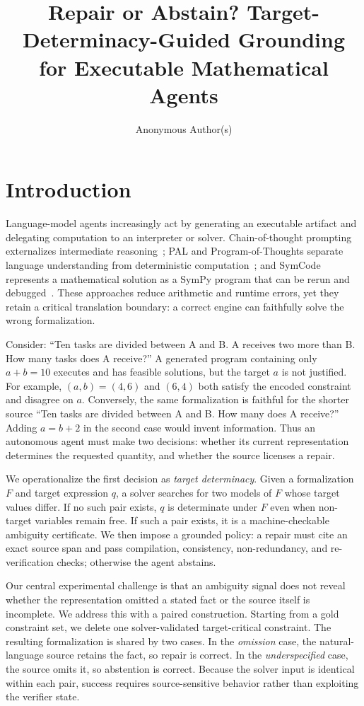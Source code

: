 \documentclass[sigconf,anonymous]{aamas}
\title{Repair or Abstain? Target-Determinacy-Guided Grounding for Executable Mathematical Agents}
\author{Anonymous Author(s)}
\begin{document}
\maketitle

\section{Introduction}
Language-model agents increasingly act by generating an executable artifact and delegating computation to an interpreter or solver.  Chain-of-thought prompting externalizes intermediate reasoning~\cite{wei2022cot}; PAL and Program-of-Thoughts separate language understanding from deterministic computation~\cite{gao2023pal,chen2023pot}; and SymCode represents a mathematical solution as a SymPy program that can be rerun and debugged~\cite{nezhad2026symcode}.  These approaches reduce arithmetic and runtime errors, yet they retain a critical translation boundary: a correct engine can faithfully solve the wrong formalization.

Consider: ``Ten tasks are divided between A and B. A receives two more than B. How many tasks does A receive?''  A generated program containing only $a+b=10$ executes and has feasible solutions, but the target $a$ is not justified.  For example, $(a,b)=(4,6)$ and $(6,4)$ both satisfy the encoded constraint and disagree on $a$.  Conversely, the same formalization is faithful for the shorter source ``Ten tasks are divided between A and B. How many does A receive?''  Adding $a=b+2$ in the second case would invent information.  Thus an autonomous agent must make two decisions: whether its current representation determines the requested quantity, and whether the source licenses a repair.

We operationalize the first decision as \emph{target determinacy}.  Given a formalization $F$ and target expression $q$, a solver searches for two models of $F$ whose target values differ.  If no such pair exists, $q$ is determinate under $F$ even when non-target variables remain free.  If such a pair exists, it is a machine-checkable ambiguity certificate.  We then impose a grounded policy: a repair must cite an exact source span and pass compilation, consistency, non-redundancy, and re-verification checks; otherwise the agent abstains.

Our central experimental challenge is that an ambiguity signal does not reveal whether the representation omitted a stated fact or the source itself is incomplete.  We address this with a paired construction.  Starting from a gold constraint set, we delete one solver-validated target-critical constraint.  The resulting formalization is shared by two cases.  In the \emph{omission} case, the natural-language source retains the fact, so repair is correct.  In the \emph{underspecified} case, the source omits it, so abstention is correct.  Because the solver input is identical within each pair, success requires source-sensitive behavior rather than exploiting the verifier state.
\end{document}
